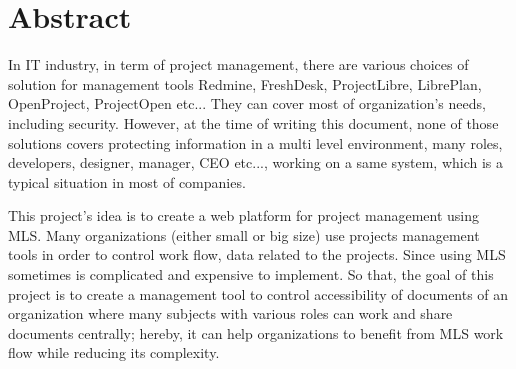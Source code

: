

\begingroup
\let\clearpage\relax
\let\cleardoublepage\relax
\let\cleardoublepage\relax

\chapter*{Abstract} %

In IT industry, in term of project management, there are various choices of solution for management tools \eg Redmine, FreshDesk, ProjectLibre, LibrePlan, OpenProject, ProjectOpen etc... They can cover most of organization's needs, including security. However, at the time of writing this document, none of those solutions covers protecting information in a multi level environment, \ie many roles, \eg developers, designer, manager, CEO etc..., working on a same system, which is a typical situation in most of companies. 

This project's idea is to create a web platform for project management using MLS. Many organizations (either small or big size) use projects management tools in order to control work flow, data related to the projects. Since using MLS sometimes is complicated and expensive to implement. So that, the goal of this project is to create a management tool to control accessibility of documents of an organization where many subjects with various roles can work and share documents centrally; hereby, it can help organizations to benefit from MLS work flow while reducing its complexity.

 \endgroup			

\vfill
